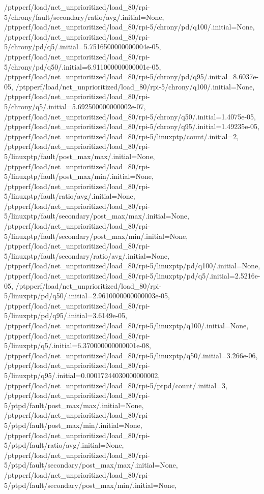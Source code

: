 {    /ptpperf/load/net_unprioritized/load_80/rpi-5/chrony/fault/secondary/ratio/avg/.initial=None,
    /ptpperf/load/net_unprioritized/load_80/rpi-5/chrony/pd/q100/.initial=None,
    /ptpperf/load/net_unprioritized/load_80/rpi-5/chrony/pd/q5/.initial=5.7516500000000004e-05,
    /ptpperf/load/net_unprioritized/load_80/rpi-5/chrony/pd/q50/.initial=6.911000000000001e-05,
    /ptpperf/load/net_unprioritized/load_80/rpi-5/chrony/pd/q95/.initial=8.6037e-05,
    /ptpperf/load/net_unprioritized/load_80/rpi-5/chrony/q100/.initial=None,
    /ptpperf/load/net_unprioritized/load_80/rpi-5/chrony/q5/.initial=5.692500000000002e-07,
    /ptpperf/load/net_unprioritized/load_80/rpi-5/chrony/q50/.initial=1.4075e-05,
    /ptpperf/load/net_unprioritized/load_80/rpi-5/chrony/q95/.initial=1.49235e-05,
    /ptpperf/load/net_unprioritized/load_80/rpi-5/linuxptp/count/.initial=2,
    /ptpperf/load/net_unprioritized/load_80/rpi-5/linuxptp/fault/post_max/max/.initial=None,
    /ptpperf/load/net_unprioritized/load_80/rpi-5/linuxptp/fault/post_max/min/.initial=None,
    /ptpperf/load/net_unprioritized/load_80/rpi-5/linuxptp/fault/ratio/avg/.initial=None,
    /ptpperf/load/net_unprioritized/load_80/rpi-5/linuxptp/fault/secondary/post_max/max/.initial=None,
    /ptpperf/load/net_unprioritized/load_80/rpi-5/linuxptp/fault/secondary/post_max/min/.initial=None,
    /ptpperf/load/net_unprioritized/load_80/rpi-5/linuxptp/fault/secondary/ratio/avg/.initial=None,
    /ptpperf/load/net_unprioritized/load_80/rpi-5/linuxptp/pd/q100/.initial=None,
    /ptpperf/load/net_unprioritized/load_80/rpi-5/linuxptp/pd/q5/.initial=2.5216e-05,
    /ptpperf/load/net_unprioritized/load_80/rpi-5/linuxptp/pd/q50/.initial=2.9610000000000003e-05,
    /ptpperf/load/net_unprioritized/load_80/rpi-5/linuxptp/pd/q95/.initial=3.6149e-05,
    /ptpperf/load/net_unprioritized/load_80/rpi-5/linuxptp/q100/.initial=None,
    /ptpperf/load/net_unprioritized/load_80/rpi-5/linuxptp/q5/.initial=6.370000000000001e-08,
    /ptpperf/load/net_unprioritized/load_80/rpi-5/linuxptp/q50/.initial=3.266e-06,
    /ptpperf/load/net_unprioritized/load_80/rpi-5/linuxptp/q95/.initial=0.00017244030000000002,
    /ptpperf/load/net_unprioritized/load_80/rpi-5/ptpd/count/.initial=3,
    /ptpperf/load/net_unprioritized/load_80/rpi-5/ptpd/fault/post_max/max/.initial=None,
    /ptpperf/load/net_unprioritized/load_80/rpi-5/ptpd/fault/post_max/min/.initial=None,
    /ptpperf/load/net_unprioritized/load_80/rpi-5/ptpd/fault/ratio/avg/.initial=None,
    /ptpperf/load/net_unprioritized/load_80/rpi-5/ptpd/fault/secondary/post_max/max/.initial=None,
    /ptpperf/load/net_unprioritized/load_80/rpi-5/ptpd/fault/secondary/post_max/min/.initial=None,
}
